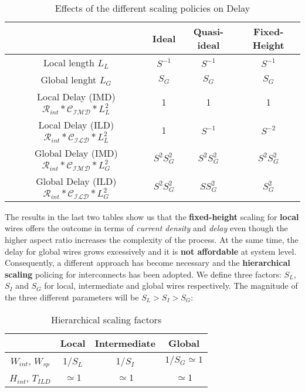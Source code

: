 \documentclass[a4paper, 12pt, twoside, openright]{report}
\begin{document}
\begin{table}[H] {
\begin{center} {
\begin{tabular}{||c|c|c|c||}
\hline
&Ideal&Quasi-ideal&Fixed-Height\\
\hline
Local length \textbf{$L_{L}$}&$S^{-1}$&$S^{-1}$&$S^{-1}$\\
\hline
Global lenght \textbf{$L_{G}$}&$S_{G}$&$S_{G}$&$S_{G}$\\
\hline
Local Delay (IMD) \textbf{$\mathcal{R}_{int}*\mathcal{C_{IMD}}*L_L^2$}&1&1&1\\
\hline
Local Delay (ILD) \textbf{$\mathcal{R}_{int}*\mathcal{C_{ILD}}*L_L^2$}&1&$S^{-1}$&$S^{-2}$\\
\hline
Global Delay (IMD) \textbf{$\mathcal{R}_{int}*\mathcal{C_{IMD}}*L_G^2$}&$S^{2}S_G^2$&$S^{2}S_G^2$&$S^{2}S_G^2$\\
\hline
Global Delay (ILD) \textbf{$\mathcal{R}_{int}*\mathcal{C_{ILD}}*L_G^2$}&$S^{2}S_G^2$&$S S_G^2$&$S_G^2$\\
\hline
\end{tabular} }
\caption{Effects of the different scaling policies on Delay}
\end{center} }
\end{table}

The results in the last two tables show us that the \textbf{fixed-height} scaling for \textbf{local} wires offers the outcome in terms of \textit{current density} and \textit{delay} even though the higher aspect ratio increases the complexity of the process. 
At the same time, the delay for global wires grows excessively and it is \textbf{not affordable} at system level. Consequently, a different approach has become necessary and the \textbf{hierarchical scaling} policing for interconnects has been adopted. We define three factors: $S_{L}$, $S_{I}$ and $S_{G}$ for local, intermediate and global wires respectively. The magnitude of the three different parameters will be $S_{L}>S_{I}>S_{G}$:

\begin{table}[H] {
\begin{center} {
\begin{tabular}{||c|c|c|c||}
\hline
&Local&Intermediate&Global\\
\hline
$W_{int}$, $W_{sp}$&1/$S_{L}$&1/$S_{I}$&$1/S_{G} \simeq 1$\\
\hline
$H_{int}$, $T_{ILD}$&$\simeq 1$&$\simeq 1$&$\simeq 1$\\
\hline
\end{tabular} }
\caption{Hierarchical scaling factors}
\end{center} }
\end{table}
\end{document}
